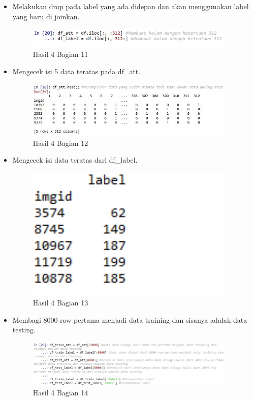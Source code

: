 \begin{itemize}
\item Melakukan drop pada label yang ada didepan dan akan menggunakan label yang baru di joinkan.

\begin{figure}[H]
\centerline{\includegraphics[width=10cm]{figures/1174087/3/18.png}}
\caption{Hasil 4 Bagian 11}
\label{labelgambar}
\end{figure}

\item Mengecek isi 5 data teratas pada df\_att.

\begin{figure}[H]
\centerline{\includegraphics[width=10cm]{figures/1174087/3/35.png}}
\caption{Hasil 4 Bagian 12}
\label{labelgambar}
\end{figure}

\item Mengecek isi data teratas dari df\_label.

\begin{figure}[H]
\centerline{\includegraphics[width=10cm]{figures/1174087/3/19.png}}
\caption{Hasil 4 Bagian 13}
\label{labelgambar}
\end{figure}

\item Membagi 8000 row pertama menjadi data training dan sisanya adalah data testing.

\begin{figure}[H]
\centerline{\includegraphics[width=10cm]{figures/1174087/3/20.png}}
\caption{Hasil 4 Bagian 14}
\label{labelgambar}
\end{figure}


\end{itemize}

